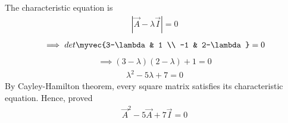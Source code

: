 The characteristic equation is 
\begin{align}
|\vec{A}-\lambda \vec{I}|=0
\end{align}
\begin{align}
\implies det\myvec{3-\lambda & 1 \\ -1 & 2-\lambda}=0
\end{align}
\begin{align}
\implies (3-\lambda)(2-\lambda)+1=0
\end{align}
\begin{align}
	\lambda^2-5\lambda+7=0
\end{align}
By Cayley-Hamilton theorem, every square matrix satisfies its characteristic equation. Hence, proved
\begin{align}
	\vec{A}^2-5\vec{A}+7\vec{I}=0
\end{align}
